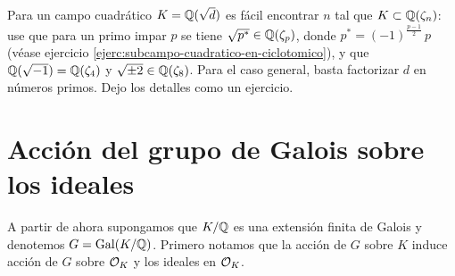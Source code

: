 \begin{ejemplo}
  Para un campo cuadrático $K = \mathbb{Q} (\sqrt{d})$ es fácil encontrar $n$ tal que
  $K \subset \mathbb{Q} (\zeta_n)$: use que para un primo impar $p$ se tiene
  $\sqrt{p^*} \in \mathbb{Q} (\zeta_p)$, donde
  $p^* = (-1)^{\frac{p-1}{2}}\,p$ (véase ejercicio
  \ref{ejerc:subcampo-cuadratico-en-ciclotomico}), y que
  $\mathbb{Q} (\sqrt{-1}) = \mathbb{Q} (\zeta_4)$ y
  $\sqrt{\pm 2} \in \mathbb{Q} (\zeta_8)$. Para el caso general, basta
  factorizar $d$ en números primos. Dejo los detalles como un ejercicio.
\end{ejemplo}


\section{Acción del grupo de Galois sobre los ideales}

A partir de ahora supongamos que $K/\mathbb{Q}$ es una extensión finita de Galois y
denotemos $G = \operatorname{Gal} (K/\mathbb{Q})$. Primero notamos que la acción de $G$ sobre $K$
induce acción de $G$ sobre $\mathcal{O}_K$ y los ideales en $\mathcal{O}_K$.

